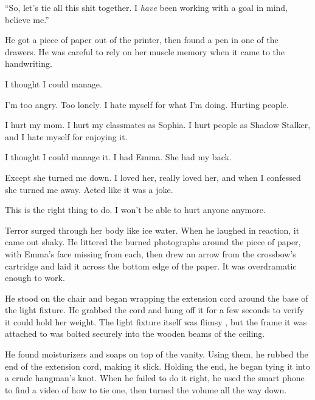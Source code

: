 ``So, let's tie all this shit together.  I \emph{have} been working with a goal in mind, believe me.''



He got a piece of paper out of the printer, then found a pen in one of the drawers.  He was careful to rely on her muscle memory when it came to the handwriting.



I thought I could manage.



I'm too angry.  Too lonely.  I hate myself for what I'm doing.  Hurting people.



I hurt my mom.  I hurt my classmates as Sophia.  I hurt people as Shadow Stalker, and I hate myself for enjoying it.



I thought I could manage it.  I had Emma.  She had my back.



Except she turned me down.  I loved her, really loved her, and when I confessed she turned me away.  Acted like it was a joke.



This is the right thing to do.  I won't be able to hurt anyone anymore.



Terror surged through her body like ice water.  When he laughed in reaction, it came out shaky.  He littered the burned photographs around the piece of paper, with Emma's face missing from each, then drew an arrow from the crossbow's cartridge and laid it across the bottom edge of the paper.  It was overdramatic enough to work.



He stood on the chair and began wrapping the extension cord around the base of the light fixture.  He grabbed the cord and hung off it for a few seconds to verify it could hold her weight.  The light fixture itself was flimsy , but the frame it was attached to was bolted securely into the wooden beams of the ceiling.



He found moisturizers and soaps on top of the vanity.  Using them, he rubbed the end of the extension cord, making it slick.  Holding the end, he began tying it into a crude hangman's knot.  When he failed to do it right, he used the smart phone to find a video of how to tie one, then turned the volume all the way down.



